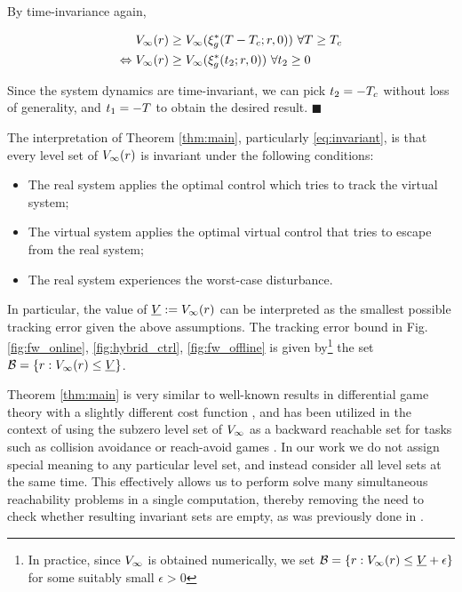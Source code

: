  By time-invariance again,
 
 \begin{equation}
 \begin{aligned}
 V_\infty(r) &\ge V_\infty(\xi_g^*(T-T_c; r, 0)) ~ \forall T\ge T_c \\
 \Leftrightarrow  V_\infty(r) &\ge V_\infty(\xi_g^*(t_2; r, 0)) ~ \forall t_2 \ge 0
 \end{aligned}
 \end{equation} 
 
   Since the system dynamics are time-invariant, we can pick $t_2 = -T_c$ without loss of generality, and $t_1 = -T$ to obtain the desired result. \hfill $\blacksquare$
 
\begin{rem}
  The interpretation of Theorem \ref{thm:main}, particularly \eqref{eq:invariant}, is that every level set of $V_\infty(r)$ is invariant under the following conditions:
  \begin{itemize}
    \item The real system applies the optimal control which tries to track the virtual system;
    \item The virtual system applies the optimal virtual control that tries to escape from the real system;
    \item The real system experiences the worst-case disturbance.
  \end{itemize}
  
  In particular, the value of $\underline{V} := V_\infty(r)$ can be interpreted as the smallest possible tracking error  given the above assumptions. The tracking error bound in Fig. \ref{fig:fw_online}, \ref{fig:hybrid_ctrl}, \ref{fig:fw_offline} is given by\footnote{In practice, since $V_\infty$ is obtained numerically, we set $\mathcal B = \{r: V_\infty(r) \le \underline{V} + \epsilon\}$ for some suitably small $\epsilon>0$} the set $\mathcal B = \{r: V_\infty(r) \le \underline{V}\}$.
  
\end{rem}
 
 
 \begin{rem} 
   Theorem \ref{thm:main} is very similar to well-known results in differential game theory with a slightly different cost function \cite{}, and has been utilized in the context of using the subzero level set of $V_\infty$ as a backward reachable set for tasks such as collision avoidance or reach-avoid games \cite{}. In our work we do not assign special meaning to any particular level set, and instead consider all level sets at the same time. This effectively allows us to perform solve many simultaneous reachability problems in a single computation, thereby removing the need to check whether resulting invariant sets are empty, as was previously done in .
 \end{rem}

